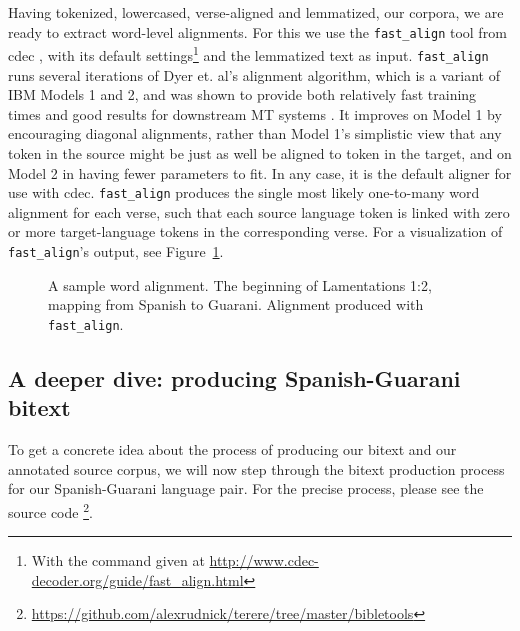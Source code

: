 Having tokenized, lowercased, verse-aligned and lemmatized, our corpora, we are
ready to extract word-level alignments.  For this we use the
\texttt{fast\_align} tool from cdec \cite{dyer-EtAl:2010:Demos}, with its
default settings\footnote{With the command given at
\url{http://www.cdec-decoder.org/guide/fast_align.html}} and the lemmatized
text as input.  \texttt{fast\_align} runs several iterations of Dyer et. al's
alignment algorithm, which is a variant of IBM Models 1 and 2, and was shown to
provide both relatively fast training times and good results for downstream MT
systems \cite{dyer-chahuneau-smith:2013:NAACL-HLT}. It improves on Model 1 by
encouraging diagonal alignments, rather than Model 1's simplistic view that any
token in the source might be just as well be aligned to token in the target,
and on Model 2 in having fewer parameters to fit. In any case, it is the
default aligner for use with cdec. \texttt{fast\_align} produces the single most
likely one-to-many word alignment for each verse, such that each source
language token is linked with zero or more target-language tokens in the
corresponding verse. For a visualization of \texttt{fast\_align}'s output, see
Figure~\ref{fig:example-word-alignment}.

\begin{figure}
  \caption{A sample word alignment. The beginning of Lamentations 1:2, mapping
  from Spanish to Guarani. Alignment produced with \texttt{fast\_align}.}
  \label{fig:example-word-alignment}
\end{figure}

\subsection{A deeper dive: producing Spanish-Guarani bitext}
To get a concrete idea about the process of producing our bitext and our
annotated source corpus, we will now step through the bitext production process
for our Spanish-Guarani language pair. For the precise process, please see the
source code
\footnote{\url{https://github.com/alexrudnick/terere/tree/master/bibletools}}.

